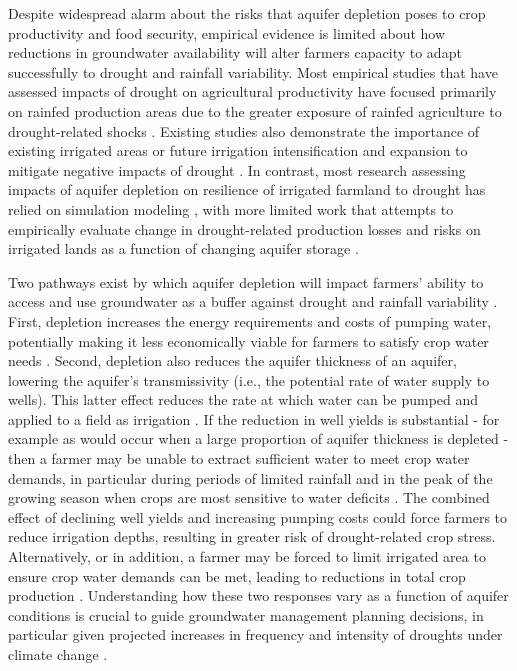 \documentclass[
]{article}
\begin{document}
Despite widespread alarm about the risks that aquifer depletion poses to crop productivity and food security, empirical evidence is limited about how reductions in groundwater availability will alter farmers capacity to adapt successfully to drought and rainfall variability. Most empirical studies that have assessed impacts of drought on agricultural productivity have focused primarily on rainfed production areas due to the greater exposure of rainfed agriculture to drought-related shocks \citep{schlenker2009nonlinear, lobell2014greater, schlenker2010robust, zhou2020connections, borgomeo2020impact}. Existing studies also demonstrate the importance of existing irrigated areas or future irrigation intensification and expansion to mitigate negative impacts of drought \citep{kuwayama2019estimating, zipper2016drought, zhu2022untangling, zhu2022warming, lu2020mapping, davis2019sensitivity, li2018changes}. In contrast, most research assessing impacts of aquifer depletion on resilience of irrigated farmland to drought has relied on simulation modeling \citep{foster2015well, cotterman2018groundwater, kahil2015modeling, yoon2021coupled, rad2020mod}, with more limited work that attempts to empirically evaluate change in drought-related production losses and risks on irrigated lands as a function of changing aquifer storage \citep{jain2021groundwater, suter2021depletion}.

Two pathways exist by which aquifer depletion will impact farmers' ability to access and use groundwater as a buffer against drought and rainfall variability \citep{foster2015analysis}. First, depletion increases the energy requirements and costs of pumping water, potentially making it less economically viable for farmers to satisfy crop water needs \citep{mieno2017price, bhattarai2021impact}. Second, depletion also reduces the aquifer thickness of an aquifer, lowering the aquifer's transmissivity (i.e., the potential rate of water supply to wells). This latter effect reduces the rate at which water can be pumped and applied to a field as irrigation \citep{konikow2005groundwater, foster2014modeling, hrozencik2017heterogeneous}. If the reduction in well yields is substantial - for example as would occur when a large proportion of aquifer thickness is depleted \citep{hecox2002calculation, korus2020depletion} - then a farmer may be unable to extract sufficient water to meet crop water demands, in particular during periods of limited rainfall and in the peak of the growing season when crops are most sensitive to water deficits \citep{foster2015well, rouhi2020downside}. The combined effect of declining well yields and increasing pumping costs could force farmers to reduce irrigation depths, resulting in greater risk of drought-related crop stress. Alternatively, or in addition, a farmer may be forced to limit irrigated area to ensure crop water demands can be met, leading to reductions in total crop production \citep{foster2014modeling, rad2020effects}. Understanding how these two responses vary as a function of aquifer conditions is crucial to guide groundwater management planning decisions, in particular given projected increases in frequency and intensity of droughts under climate change \citep{ukkola2020robust, chiang2021evidence, cook2020twenty}.
\end{document}
